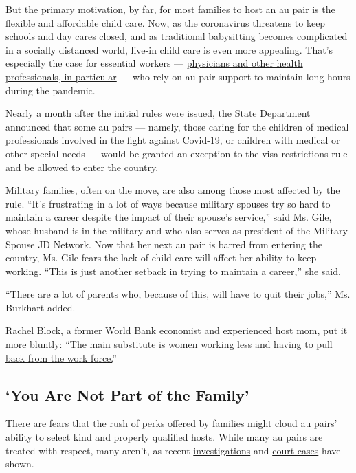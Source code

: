 But the primary motivation, by far, for most families to host an au pair
is the flexible and affordable child care. Now, as the coronavirus
threatens to keep schools and day cares closed, and as traditional
babysitting becomes complicated in a socially distanced world, live-in
child care is even more appealing. That's especially the case for
essential workers ---
\href{https://www.nytimes.com/2020/03/16/us/coronavirus-doctors-nurses.html}{physicians
and other health professionals, in particular} --- who rely on au pair
support to maintain long hours during the pandemic.

Nearly a month after the initial rules were issued, the State Department
announced that some au pairs --- namely, those caring for the children
of medical professionals involved in the fight against Covid-19, or
children with medical or other special needs --- would be granted an
exception to the visa restrictions rule and be allowed to enter the
country.

Military families, often on the move, are also among those most affected
by the rule. ``It's frustrating in a lot of ways because military
spouses try so hard to maintain a career despite the impact of their
spouse's service,'' said Ms. Gile, whose husband is in the military and
who also serves as president of the Military Spouse JD Network. Now that
her next au pair is barred from entering the country, Ms. Gile fears the
lack of child care will affect her ability to keep working. ``This is
just another setback in trying to maintain a career,'' she said.

``There are a lot of parents who, because of this, will have to quit
their jobs,'' Ms. Burkhart added.

Rachel Block, a former World Bank economist and experienced host mom,
put it more bluntly: ``The main substitute is women working less and
having to
\href{https://www.nytimes.com/2020/06/03/business/economy/coronavirus-working-women.html}{pull
back from the work force.}''

\hypertarget{you-are-not-part-of-the-family}{%
\subsection{`You Are Not Part of the
Family'}\label{you-are-not-part-of-the-family}}

There are fears that the rush of perks offered by families might cloud
au pairs' ability to select kind and properly qualified hosts. While
many au pairs are treated with respect, many aren't, as recent
\href{https://www.politico.com/magazine/story/2017/03/au-pair-program-abuse-state-department-214956}{investigations}
and
\href{https://www.nytimes.com/2020/01/08/us/au-pair-massachusetts-ruling.html}{court
cases} have shown.

